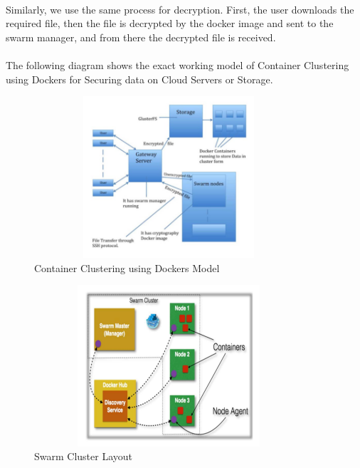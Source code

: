 \paragraph{\hspace{24pt}}
Similarly, we use the same process for decryption. First, the user downloads the required file, then the file is decrypted by the docker image and sent to the swarm manager, and from there the decrypted file is received.

\paragraph{\hspace{24pt}}
The following diagram shows the exact working model of Container Clustering using Dockers for Securing data on Cloud Servers or Storage.

\begin{figure}[htb]
\centering
\includegraphics[width=10cm,height=6cm]{5-contents/8-encryption-over-cloud-model-and-its-process-using-container/images/container-clustering-docker.png} %
\caption{Container Clustering using Dockers Model}
\label{fig:label} %
\end{figure}

\begin{figure}[htb]
\centering
\includegraphics[width=10cm,height=6cm]{5-contents/8-encryption-over-cloud-model-and-its-process-using-container/images/docker-swarm-layout.png} %
\caption{Swarm Cluster Layout}
\label{fig:label} %
\end{figure}

